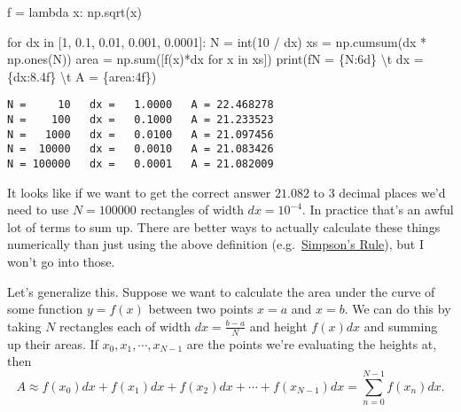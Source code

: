 \documentclass[
  letterpaper,
  DIV=11,
  numbers=noendperiod]{scrreprt}
\newenvironment{Shaded}{\begin{snugshade}}{\end{snugshade}}
\newcommand{\BuiltInTok}[1]{\textcolor[rgb]{0.00,0.23,0.31}{#1}}
\newcommand{\CharTok}[1]{\textcolor[rgb]{0.13,0.47,0.30}{#1}}
\newcommand{\ControlFlowTok}[1]{\textcolor[rgb]{0.00,0.23,0.31}{#1}}
\newcommand{\DecValTok}[1]{\textcolor[rgb]{0.68,0.00,0.00}{#1}}
\newcommand{\FloatTok}[1]{\textcolor[rgb]{0.68,0.00,0.00}{#1}}
\newcommand{\KeywordTok}[1]{\textcolor[rgb]{0.00,0.23,0.31}{#1}}
\newcommand{\NormalTok}[1]{\textcolor[rgb]{0.00,0.23,0.31}{#1}}
\newcommand{\OperatorTok}[1]{\textcolor[rgb]{0.37,0.37,0.37}{#1}}
\newcommand{\SpecialCharTok}[1]{\textcolor[rgb]{0.37,0.37,0.37}{#1}}
\newcommand{\SpecialStringTok}[1]{\textcolor[rgb]{0.13,0.47,0.30}{#1}}
\begin{document}
\begin{Shaded}
\begin{Highlighting}[]
\NormalTok{f }\OperatorTok{=} \KeywordTok{lambda}\NormalTok{ x: np.sqrt(x)}

\ControlFlowTok{for}\NormalTok{ dx }\KeywordTok{in}\NormalTok{ [}\DecValTok{1}\NormalTok{, }\FloatTok{0.1}\NormalTok{, }\FloatTok{0.01}\NormalTok{, }\FloatTok{0.001}\NormalTok{, }\FloatTok{0.0001}\NormalTok{]:}
\NormalTok{    N }\OperatorTok{=} \BuiltInTok{int}\NormalTok{(}\DecValTok{10} \OperatorTok{/}\NormalTok{ dx)}
\NormalTok{    xs }\OperatorTok{=}\NormalTok{ np.cumsum(dx }\OperatorTok{*}\NormalTok{ np.ones(N))}
\NormalTok{    area }\OperatorTok{=}\NormalTok{ np.}\BuiltInTok{sum}\NormalTok{([f(x)}\OperatorTok{*}\NormalTok{dx }\ControlFlowTok{for}\NormalTok{ x }\KeywordTok{in}\NormalTok{ xs])}
    \BuiltInTok{print}\NormalTok{(}\SpecialStringTok{f\textquotesingle{}N = }\SpecialCharTok{\{}\NormalTok{N}\SpecialCharTok{:6d\}}\SpecialStringTok{ }\CharTok{\textbackslash{}t}\SpecialStringTok{ dx = }\SpecialCharTok{\{}\NormalTok{dx}\SpecialCharTok{:8.4f\}}\SpecialStringTok{ }\CharTok{\textbackslash{}t}\SpecialStringTok{ A = }\SpecialCharTok{\{}\NormalTok{area}\SpecialCharTok{:4f\}}\SpecialStringTok{\textquotesingle{}}\NormalTok{)}
\end{Highlighting}
\end{Shaded}

\begin{verbatim}
N =     10   dx =   1.0000   A = 22.468278
N =    100   dx =   0.1000   A = 21.233523
N =   1000   dx =   0.0100   A = 21.097456
N =  10000   dx =   0.0010   A = 21.083426
N = 100000   dx =   0.0001   A = 21.082009
\end{verbatim}

It looks like if we want to get the correct answer \(21.082\) to 3
decimal places we'd need to use \(N=100000\) rectangles of width
\(dx=10^{-4}\). In practice that's an awful lot of terms to sum up.
There are better ways to actually calculate these things numerically
than just using the above definition
(e.g.~\href{https://en.wikipedia.org/wiki/Simpson\%27s_rule}{Simpson's
Rule}), but I won't go into those.

Let's generalize this. Suppose we want to calculate the area under the
curve of some function \(y=f(x)\) between two points \(x=a\) and
\(x=b\). We can do this by taking \(N\) rectangles each of width
\(dx=\frac{b-a}{N}\) and height \(f(x)dx\) and summing up their areas.
If \(x_0,x_1,\cdots,x_{N-1}\) are the points we're evaluating the
heights at, then
\[A \approx f(x_0)dx + f(x_1)dx + f(x_2)dx + \cdots + f(x_{N-1})dx = \sum_{n=0}^{N-1} f(x_n) dx.\]
\end{document}
